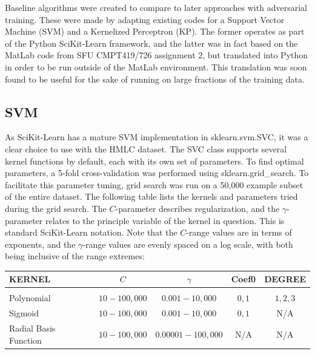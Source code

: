 \documentclass          {article} %
\begin{document}
Baseline algorithms were created to compare to later approaches with adversarial training. These were made by adapting existing codes for a Support Vector Machine (SVM) and a Kernelized Perceptron (KP). The former operates as part of the Python SciKit-Learn framework, and the latter was in fact based on the MatLab code from SFU CMPT419/726 assignment 2, but translated into Python in order to be run outside of the MatLab environment. This translation was soon found to be useful for the sake of running on large fractions of the training data.

            \subsection {SVM}
            \label      {SVM}
As SciKit-Learn has a mature SVM implementation in sklearn.svm.SVC, it was a clear choice to use with the HMLC dataset. The SVC class supports several kernel functions by default, each with its own set of parameters. To find optimal parameters, a 5-fold cross-validation was performed using sklearn.grid\_search. To facilitate this parameter tuning, grid search was run on a 50,000 example subset of the entire dataset. The following table lists the kernels and parameters tried during the grid search. The $C$-parameter describes regularization, and the $\gamma$-parameter relates to the principle variable of the kernel in question. This is standard SciKit-Learn notation. Note that the $C$-range values are in terms of exponents, and the $\gamma$-range values are evenly spaced on a log scale, with both being inclusive of the range extremes:

\begin{center}
\begin{tabular}{l c c c c}
  {\bf KERNEL} & $C$ & $\gamma$ & {\bf Coef0} & {\bf DEGREE}
\\ \hline \\
  Polynomial            & $10-100,000$ & $0.001-10,000$    & $0,1$ & $1,2,3$\\
  Sigmoid               & $10-100,000$ & $0.001-10,000$    & $0,1$ & N/A\\
  Radial Basis Function & $10-100,000$ & $0.00001-100,000$ & N/A   & N/A\\
\end{tabular}
\end{center}
\end{document}
